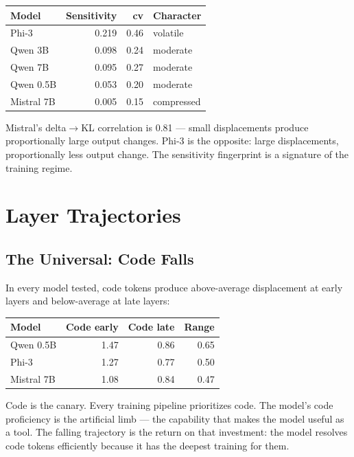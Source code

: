\documentclass[11pt,a4paper]{article}
\begin{document}
\begin{center}
\begin{tabular}{lrrl}
\toprule
\textbf{Model} & \textbf{Sensitivity} & \textbf{cv} & \textbf{Character} \\
\midrule
Phi-3 & 0.219 & 0.46 & volatile \\
Qwen 3B & 0.098 & 0.24 & moderate \\
Qwen 7B & 0.095 & 0.27 & moderate \\
Qwen 0.5B & 0.053 & 0.20 & moderate \\
Mistral 7B & 0.005 & 0.15 & compressed \\
\bottomrule
\end{tabular}
\end{center}

Mistral's delta$\to$KL correlation is 0.81 --- small displacements produce proportionally large output changes. Phi-3 is the opposite: large displacements, proportionally less output change. The sensitivity fingerprint is a signature of the training regime.

\section{Layer Trajectories}

\subsection{The Universal: Code Falls}

In every model tested, code tokens produce above-average displacement at early layers and below-average at late layers:

\begin{center}
\begin{tabular}{lrrr}
\toprule
\textbf{Model} & \textbf{Code early} & \textbf{Code late} & \textbf{Range} \\
\midrule
Qwen 0.5B & 1.47 & 0.86 & 0.65 \\
Phi-3 & 1.27 & 0.77 & 0.50 \\
Mistral 7B & 1.08 & 0.84 & 0.47 \\
\bottomrule
\end{tabular}
\end{center}

Code is the canary. Every training pipeline prioritizes code. The model's code proficiency is the artificial limb --- the capability that makes the model useful as a tool. The falling trajectory is the return on that investment: the model resolves code tokens efficiently because it has the deepest training for them.
\end{document}
